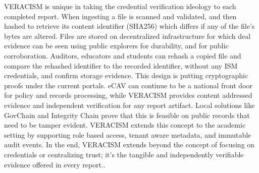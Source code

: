 VERACISM is unique in taking the credential verification ideology to each completed report. When ingesting a file is scanned and validated, and then hashed to retrieve its content identifier (SHA256) which differs if any of the file's bytes are altered. Files are stored on decentralized infrastructure for which deal evidence can be seen using public explorers for durability, and for public corroboration. Auditors, educators and students can rehash a copied file and compare the rehashed identifier to the recorded identifier, without any ISM credentials, and confirm storage evidence. This design is putting cryptographic proofs under the current portals. eCAV can continue to be a national front door for policy and records processing, while VERACISM provides content addressed evidence and independent verification for any report artifact. Local solutions like GovChain and Integrity Chain prove that this is feasible on public records that need to be tamper evident. VERACISM extends this concept to the academic setting by supporting role based access, tenant aware metadata, and immutable audit events. In the end, VERACISM extends beyond the concept of focusing on credentials or centralizing trust; it's the tangible and independently verifiable evidence offered in every report.\citep{CommissionOnHigherEducationND,BetterGovernmentPhilippinesND,DPWH2025,GovTech2019,SkillsFuture2018,NTUND,EduCredPH2024,Naji2023,MohebiAghdam2024}.

